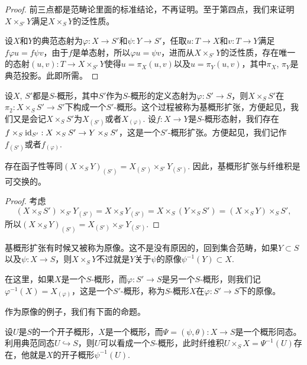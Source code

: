\begin{proof}
前三点都是范畴论里面的标准结论，不再证明。至于第四点，我们来证明$X\times_{S'} Y$满足$X\times_S Y$的泛性质。

设$X$和$Y$的典范态射为$\varphi:X\to S'$和$\psi:Y\to S'$，任取$u:T\to X$和$v:T\to Y$满足$f\varphi u=f\psi v$，由于$f$是单态射，所以$\varphi u =\psi v$，进而从$X\times_{S'} Y$的泛性质，存在唯一的态射$(u,v):T\to X\times_{S'} Y$使得$u=\pi_X (u,v)$以及$u=\pi_Y (u,v)$，其中$\pi_X$, $\pi_Y$是典范投影。此即所需。
\end{proof}

\begin{para}[基概形扩张]
设$X$, $S'$都是$S$-概形，其中$S'$作为$S$-概形的定义态射为$\varphi:S'\to S$，则$X\times_S S'$在$\pi_2:X\times_S S'\to S'$下构成一个$S'$-概形。这个过程被称为基概形扩张，方便起见，我们又是会记$X\times_S S'$为$X_{(S')}$或者$X_{(\varphi)}$. 设$f:X\to Y$是$S$-概形态射，我们存在$f\times_S \operatorname{id}_{S'}:X\times_S S'\to Y\times_S S'$，这是一个$S'$-概形扩张。方便起见，我们记作$f_{(S')}$或者$f_{(\varphi)}$. 
\end{para}

\begin{pro}
存在函子性等同$(X\times_S Y)_{(S')}=X_{(S')}\times_{S'} Y_{(S')}$. 因此，基概形扩张与纤维积是可交换的。
\end{pro}

\begin{proof}
考虑
\[
	(X\times_S S')\times_{S'}Y_{(S')}=X\times_{S}Y_{(S')}=X\times_{S}(Y\times_S S')=(X\times_{S} Y)\times_S S',
\]
所以$(X\times_S Y)_{(S')}=X_{(S')}\times_{S'} Y_{(S')}$.
\end{proof}

\begin{para}[原像]
基概形扩张有时候又被称为原像。这不是没有原因的，回到集合范畴，如果$Y\subset S$以及$\psi:X\to S$，则$X\times_S Y$不过就是$Y$关于$\psi$的原像$\psi^{-1}(Y)\subset X$. 

在这里，如果$X$是一个$S$-概形，而$\varphi:S'\to S$是另一个$S$-概形，则我们记$\varphi^{-1}(X)=X_{(\varphi)}$，这是一个$S'$-概形，称为$S$-概形$X$在$\varphi:S'\to S$下的原像。
\end{para}

作为原像的例子，我们有下面的命题。

\begin{pro}\label{preimage}
设$U$是$S$的一个开子概形，$X$是一个概形，而$\Psi=(\psi,\theta):X\to S$是一个概形同态。利用典范同态$U\hookrightarrow S$，则$U$可以看成一个$S$-概形，此时纤维积$U\times_S X=\Psi^{-1}(U)$存在，他就是$X$的开子概形$\psi^{-1}(U)$.
\end{pro}

